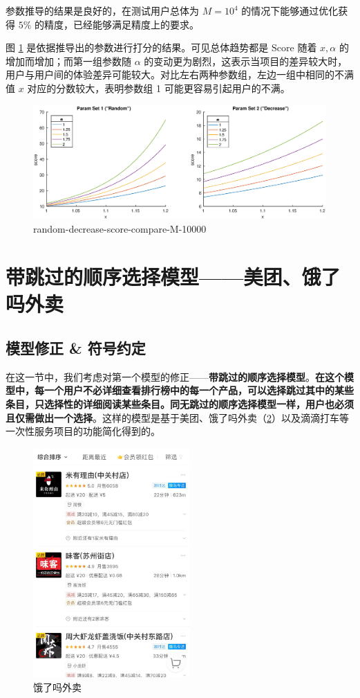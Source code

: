 \documentclass[UTF8]{ctexart}
\theoremstyle{plain}
\theoremstyle{definition}
\theoremstyle{remark}
\begin{document}
	参数推导的结果是良好的，在测试用户总体为 $M=10^4$ 的情况下能够通过优化获得 $5\%$ 的精度，已经能够满足精度上的要求。

	图 \ref{fig:random-decrease-score-compare-M-10000} 是依据推导出的参数进行打分的结果。可见总体趋势都是 $\text{Score}$ 随着 $x, \alpha$ 的增加而增加；而第一组参数随 $\alpha$ 的变动更为剧烈，这表示当项目的差异较大时，用户与用户间的体验差异可能较大。对比左右两种参数组，左边一组中相同的不满值 $x$ 对应的分数较大，表明参数组 1 可能更容易引起用户的不满。
	
	\begin{figure}[h!] 
		\centering
		\includegraphics[width = \linewidth]{../model/steam/pic/random-decrease-score-compare-M-10000.eps}
		\caption{random-decrease-score-compare-M-10000}\label{fig:random-decrease-score-compare-M-10000}
	\end{figure}
	
	
	\section{带跳过的顺序选择模型——美团、饿了吗外卖}
	\subsection{模型修正 \& 符号约定}
	在这一节中，我们考虑对第一个模型的修正——\textbf{带跳过的顺序选择模型}。\textbf{在这个模型中，每一个用户不必详细查看排行榜中的每一个产品，可以选择跳过其中的某些条目，只选择性的详细阅读某些条目。同无跳过的顺序选择模型一样，用户也必须且仅需做出一个选择}。这样的模型是基于美团、饿了吗外卖（\ref{modelB_fig_1}）以及滴滴打车等一次性服务项目的功能简化得到的。
	\begin{figure}[h!] 
		\centering
		\includegraphics[width = 6cm]{modelB_fig_1.jpg}
		\caption{饿了吗外卖}\label{modelB_fig_1}
	\end{figure}
	
\end{document}
